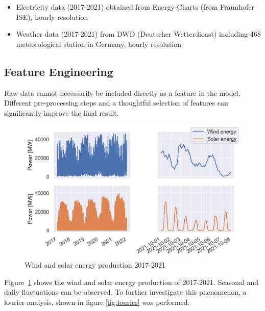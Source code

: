 \documentclass[11pt,table]{article}
\begin{document}
\begin{itemize}
  \item Electricity data (2017-2021) obtained from Energy-Charts (from Fraunhofer ISE), hourly resolution
  \item Weather data (2017-2021) from DWD (Deutscher Wetterdienst) including 468 meteorological station in Germany, hourly resolution
\end{itemize}%

\subsection{Feature Engineering}
Raw data cannot necessarily be included directly as a feature in the model. Different pre-processing steps and a thoughtful selection of features can significantly improve the final result. 

\begin{figure}[h!]
	\centering
	\includegraphics[scale=0.9]{Figures/electrData.png}
	\caption{Wind and solar energy production 2017-2021}
	\label{fig:electrData}
\end{figure}

Figure~\ref{fig:electrData} shows the wind and solar energy production of 2017-2021. Seasonal and daily fluctuations can be observed. To further investigate this phenomenon, a fourier analysis, shown in figure \ref{fig:fourier} was performed.
\end{document}
